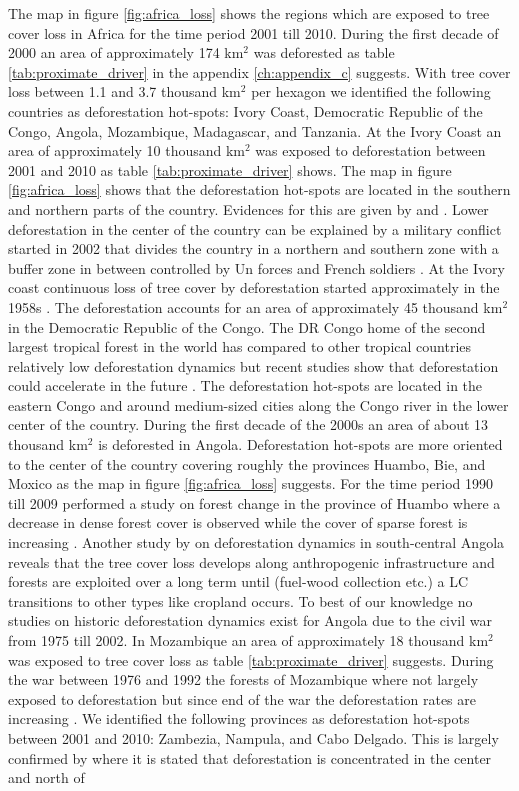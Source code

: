 			The map in figure \ref{fig:africa_loss} shows the regions which are exposed to tree cover loss in Africa for the time period 2001 till 2010. During the first decade of 2000 an area of approximately 174 km$^2$ was deforested as table \ref{tab:proximate_driver} in the appendix \ref{ch:appendix_c} suggests. With tree cover loss between 1.1 and 3.7 thousand km$^2$ per hexagon we identified the following countries as deforestation hot-spots: Ivory Coast, Democratic Republic of the Congo, Angola, Mozambique, Madagascar, and Tanzania. At the Ivory Coast an area of approximately 10 thousand km$^2$ was exposed to deforestation between 2001 and 2010 as table \ref{tab:proximate_driver} shows. The map in figure \ref{fig:africa_loss} shows that the deforestation hot-spots are located in the southern and northern parts of the country. Evidences for this are given by \citet{Goetze2006} and \citet{Barima2016}. Lower deforestation in the center of the country can be explained by a military conflict started in 2002 that divides the country in a northern and southern zone with a buffer zone in between controlled by Un forces and French soldiers \citep{Barima2016}. At the Ivory coast continuous loss of tree cover by deforestation started approximately in the 1958s \citep{Chatelain1996}. The deforestation accounts for an area of approximately 45 thousand km$^2$ in the Democratic Republic of the Congo. The DR Congo home of the second largest tropical forest in the world has compared to other tropical countries relatively low deforestation dynamics but recent studies show that deforestation could accelerate in the future \citep{Ickowitz2015}. The deforestation hot-spots are located in the eastern Congo and around medium-sized cities along the Congo river in the lower center of the country. During the first decade of the 2000s an area of about 13 thousand km$^2$ is deforested in Angola. Deforestation hot-spots are more oriented to the center of the country covering roughly the provinces Huambo, Bie, and Moxico as the map in figure \ref{fig:africa_loss} suggests. For the time period 1990 till 2009 \citet{Cabral2011} performed a study on forest change in the province of Huambo where a decrease in dense forest cover is observed while the cover of sparse forest is increasing \citep{Cabral2011}. Another study by \citet{Schneibel2017} on deforestation dynamics in south-central Angola reveals that the tree cover loss develops along anthropogenic infrastructure and forests are exploited over a long term until (fuel-wood collection etc.) a \ac{LC} transitions to other types like cropland occurs. To best of our knowledge no studies on historic deforestation dynamics exist for Angola due to the civil war from 1975 till 2002. In Mozambique an area of approximately 18 thousand km$^2$ was exposed to tree cover loss as table \ref{tab:proximate_driver} suggests. During the war between 1976 and 1992 the forests of Mozambique where not largely exposed to deforestation but since end of the war the deforestation rates are increasing \citep{Sitoe2012}. We identified the following provinces as deforestation hot-spots between 2001 and 2010: Zambezia, Nampula, and Cabo Delgado. This is largely confirmed by \citeauthor{Sitoe2012} where it is stated that deforestation is concentrated in the center and north of 